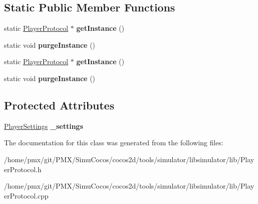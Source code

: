 \subsection*{Static Public Member Functions}
\begin{DoxyCompactItemize}
\item 
\mbox{\label{classPlayerProtocol_acf6bd6514a0db55bd7fb5d1f2589fccf}} 
static \hyperlink{classPlayerProtocol}{Player\+Protocol} $\ast$ {\bfseries get\+Instance} ()
\item 
\mbox{\label{classPlayerProtocol_a94aa569c960272eedc5773d1fac0b116}} 
static void {\bfseries purge\+Instance} ()
\item 
\mbox{\label{classPlayerProtocol_ab7fb69c0158a22795d48cd43aabaca58}} 
static \hyperlink{classPlayerProtocol}{Player\+Protocol} $\ast$ {\bfseries get\+Instance} ()
\item 
\mbox{\label{classPlayerProtocol_af1e4e01a71c21a0ede639b46817dc5c1}} 
static void {\bfseries purge\+Instance} ()
\end{DoxyCompactItemize}
\subsection*{Protected Attributes}
\begin{DoxyCompactItemize}
\item 
\mbox{\label{classPlayerProtocol_aa17c7aae8ed3aff31030c01c6bd6c770}} 
\hyperlink{classPlayerSettings}{Player\+Settings} {\bfseries \+\_\+settings}
\end{DoxyCompactItemize}


The documentation for this class was generated from the following files\+:\begin{DoxyCompactItemize}
\item 
/home/pmx/git/\+P\+M\+X/\+Simu\+Cocos/cocos2d/tools/simulator/libsimulator/lib/Player\+Protocol.\+h\item 
/home/pmx/git/\+P\+M\+X/\+Simu\+Cocos/cocos2d/tools/simulator/libsimulator/lib/Player\+Protocol.\+cpp\end{DoxyCompactItemize}
